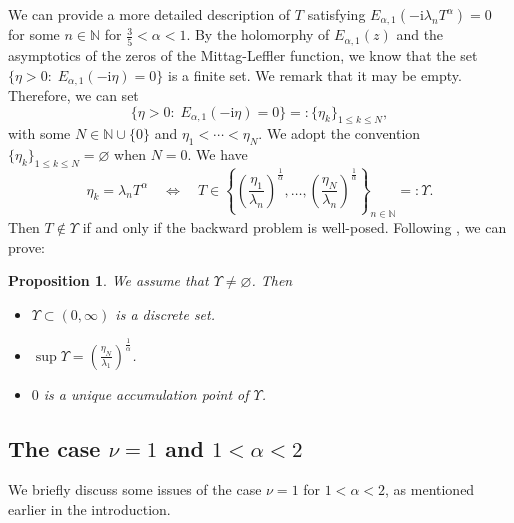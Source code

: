 \documentclass[reqno]{amsart}
\newtheorem{prop}[theorem]{Proposition}
\numberwithin{equation}{section}
\begin{document}
We can provide a more detailed description of $T$ satisfying $E_{\alpha,1}(-\mathrm{i}\lambda_{n} T^{\alpha}) = 0$ for some $n\in \mathbb{N}$ for $\frac{3}{5}<\alpha <1$. By the holomorphy of $E_{\alpha,1}(z)$ and the asymptotics of the zeros
of the Mittag-Leffler function, we know that the set $\{ \eta >0:\; E_{\alpha,1}(-\mathrm{i}\eta) = 0\}$ is a finite set. We remark that it may be empty. Therefore, we can set
$$
\{ \eta>0:\; E_{\alpha,1}(-\mathrm{i}\eta) = 0\} =: \{ \eta_k\}_{1\le k \le N},
$$
with some $N \in \mathbb{N} \cup \{0\}$ and $\eta_1 <\cdots <\eta_N$. We adopt the convention $\{\eta_k\}_{1\le k \le N}=\varnothing$ when $N=0$.
We have
$$
\eta_k = \lambda_n T^{\alpha} \quad \Longleftrightarrow \quad T \in \left\{ \left(\frac{\eta_1}{\lambda_n}\right)^{\frac{1}{\alpha}},\ldots,
\left(\frac{\eta_N}{\lambda_n}\right)^{\frac{1}{\alpha}}\right\}
_{n\in \mathbb{N}}=: \Upsilon.
$$
Then $T\not\in \Upsilon$ if and only if the backward problem is 
well-posed. Following \cite{FY20}, we can prove:
\begin{prop}  We assume that $\Upsilon \neq \varnothing$. Then
\begin{itemize}
\item[(i)] $\Upsilon \subset (0,\infty)$ is a discrete set.
\item[(ii)] $\sup \Upsilon = \left(\frac{\eta_N}{\lambda_1}\right)^{\frac{1}{\alpha}}$.
\item[(iii)] $0$ is a unique accumulation point of $\Upsilon$.
\end{itemize}
\end{prop}

\subsection*{The case $\nu=1$ and $1<\alpha<2$}
We briefly discuss some issues of the case $\nu=1$ for $1<\alpha<2$, as mentioned earlier in the introduction.
\end{document}
